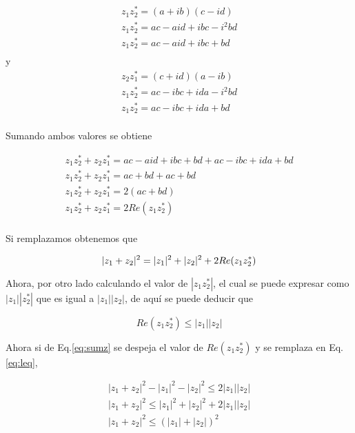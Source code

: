 \documentclass[12pt,spanish]{article}
\begin{document}
\begin{enumerate}
        \begin{gather*}
            z_1z_2^{*} = (a+ib)(c-id)\\
            z_1z_2^{*} = ac - aid + ibc - i^2bd\\
            z_1z_2^{*} = ac - aid + ibc + bd\\
        \end{gather*}
        y
        \begin{gather*}
            z_2z_1^{*} = (c+id)(a-ib)\\
            z_1z_2^{*} = ac - ibc +  ida - i^2bd\\
            z_1z_2^{*} = ac - ibc +  ida + bd\\
        \end{gather*}

        Sumando ambos valores se obtiene 

        \begin{gather*}
            z_1z_2^{*} + z_2z_1^{*} = ac - aid + ibc + bd + ac - ibc +  ida + bd\\
            z_1z_2^{*} + z_2z_1^{*} = ac + bd + ac +  bd\\
            z_1z_2^{*} + z_2z_1^{*} = 2(ac + bd)\\
            z_1z_2^{*} + z_2z_1^{*} = 2Re(z_1z_2^{*})\\
        \end{gather*}

        Si remplazamos obtenemos que

        \begin{equation}
            |z_1 + z_2|^2 = |z_1|^2 + |z_2|^2 +  2Re(z_1z_2^{*})\\
            \label{eq:sumz}
        \end{equation}

        Ahora, por otro lado calculando el valor de $|z_1z_2^{*}|$, el cual se puede expresar como $|z_1||z_2^{*}|$ que es igual a $|z_1||z_2|$, de aquí se puede deducir que

        \begin{equation}
            Re(z_1z_2^{*}) \leq |z_1||z_2|
            \label{eq:leq}
        \end{equation}

        Ahora si de Eq.\ref*{eq:sumz} se despeja el valor de $Re(z_1z_2^{*})$ y se remplaza en Eq.\ref*{eq:leq},

        \begin{gather*}
            |z_1 + z_2|^2 - |z_1|^2 - |z_2|^2  \leq 2 |z_1||z_2|\\
            |z_1 + z_2|^2   \leq  |z_1|^2 + |z_2|^2 + 2|z_1||z_2|\\
            |z_1 + z_2|^2   \leq  (|z_1| + |z_2|)^2\\
        \end{gather*}


\end{enumerate}
\end{document}
